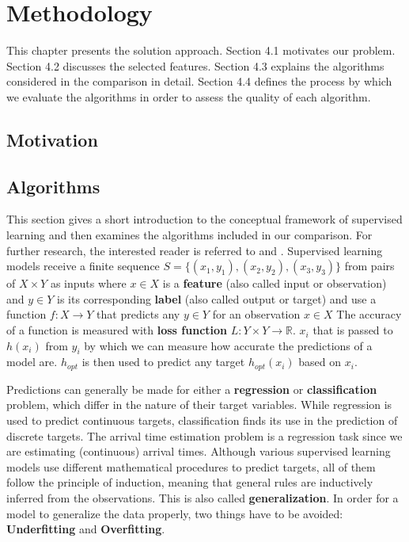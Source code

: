 

\chapter{Methodology}
This chapter presents the solution approach.
Section 4.1 motivates our problem. 
Section 4.2 discusses the selected features.
Section 4.3 explains the algorithms considered in the comparison in detail.
Section 4.4 defines the process by which we evaluate the algorithms in order to assess the quality of each algorithm.

\section{Motivation}

\section{Algorithms}
This section gives a short introduction to the conceptual framework of supervised learning and then examines the algorithms included in our comparison. For further research, the interested reader is referred to \cite{Bishop} and \cite{SLFoundations}.
Supervised learning models receive a finite sequence 
$S = \{(x_1, y_1), (x_2,y_2), (x_3,y_3)\}$ from pairs of $X \times Y$ as inputs where $x \in X$ is a \textbf{feature} (also called input or observation) and $y \in Y$ is its corresponding \textbf{label} (also called output or target) and use a function $f : X \to Y$ that predicts any $y \in Y$ for an observation $x \in X$
The accuracy of a function is measured with \textbf{loss function} $L: Y \times Y \to \mathbb{R}$. $x_i$ that is passed to $h(x_i)$ from $y_i$ by which we can measure how accurate the predictions of a model are. $h_{opt}$ is then used to predict any target $h_{opt}(x_i)$ based on $x_i$.  

Predictions can generally be made for either a \textbf{regression} or \textbf{classification} problem, which differ in the nature of their target variables. While regression is used to predict continuous targets, classification finds its use in the prediction of discrete targets. The arrival time estimation problem is a regression task since we are estimating (continuous) arrival times.
Although various supervised learning models use different mathematical procedures to predict targets, all of them follow the principle of induction, meaning that general rules are inductively inferred from the observations. This is also called \textbf{generalization}.  
In order for a model to generalize the data properly, two things have to be avoided: \textbf{Underfitting} and \textbf{Overfitting}.

